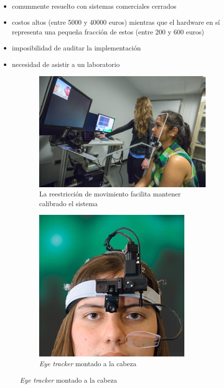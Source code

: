 \documentclass[aspectratio=169]{beamer}
\begin{document}
\begin{frame}{~}

  \begin{itemize}
    \item comunmente resuelto con sistemas comerciales cerrados
    \item costos altos (entre 5000 y 40000 euros) mientras que el hardware en
      sí representa una pequeña fracción de estos (entre 200 y 600 euros)
    \item imposibilidad de auditar la implementación
    \item necesidad de asistir a un laboratorio
  \end{itemize}

  \begin{figure}
    \begin{subfigure}{0.49\textwidth}
      \centering
      \includegraphics[width=0.6\linewidth]{img/eye-link-chinrest.jpg}
      \caption{La reestricción de movimiento facilita mantener calibrado el
      sistema}
    \end{subfigure}
    \begin{subfigure}{0.49\textwidth}
      \centering
      \includegraphics[width=0.5\linewidth]{img/eye-tracker-head-mounted.jpg}
      \caption{\textit{Eye tracker} montado a la cabeza}
    \end{subfigure}
  \end{figure}

\end{frame}
\end{document}
